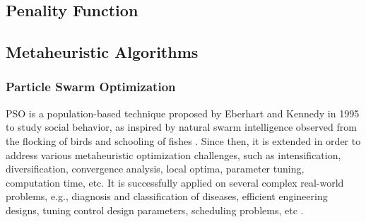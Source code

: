 \subsection{Penality Function}

\subsection{Metaheuristic Algorithms}
\subsubsection{Particle Swarm Optimization}
PSO is a population-based technique proposed by Eberhart and Kennedy in 1995 to study social behavior, as inspired by natural swarm intelligence observed from the flocking of birds and schooling of fishes \cite{Kennedy1995ParticleOptimization}. Since then, it is extended in order to address various metaheuristic optimization challenges, such as intensification, diversification, convergence analysis, local optima, parameter tuning, computation time, etc. It is successfully applied on several complex real-world problems, e.g., diagnosis and classification of diseases, efficient engineering designs, tuning control design parameters, scheduling problems, etc \cite{Poli2008AnApplications}. 


